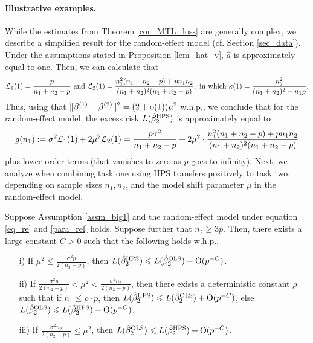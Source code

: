 \paragraph{Illustrative examples.}
While the estimates from Theorem \ref{cor_MTL_loss} are generally complex, we describe a simplified result for the random-effect model (cf. Section \ref{sec_data}).
Under the assumptions stated in Proposition \ref{lem_hat_v}, $\hat{a}$ is approximately equal to one.
Then, we can calculate that
\[ \mathcal{L}_1(1) = \frac{p}{n_1 + n_2 - p} \text{ and } \mathcal{L}_2(1) = \frac{n_1^2(n_1 + n_2 - p) + p n_1 n_2}{(n_1 + n_2)^2 (n_1 + n_2 - p)}, \text{ in which } \kappa(1) = \frac{n_2^2}{(n_1 + n_2)^2 - n_1 p}. \]
Thus, using that $\|\beta^{(1)}-\beta^{(2)}\|^2 = (2+\operatorname{o}(1))\mu^2$ w.h.p., we conclude that for the random-effect model, the excess risk $L(\hat{\beta}_2^{\textup{HPS}})$ is approximately equal to
$$ g(n_1) := \sigma^2 \mathcal L_1(1) +   2\mu^2 \mathcal L_2(1)= \frac{p\sigma^2}{n_1+n_2-p} +  2\mu^2 \cdot \frac{n_1^2 (n_1+n_2-p)+p n_1n_2}{(n_1+n_2)^2(n_1+n_2-p)}$$
plus lower order terms (that vanishes to zero as $p$ goes to infinity).
Next, we analyze when combining task one using HPS transfers positively to task two, depending on sample sizes $n_1, n_2$, and the model shift parameter $\mu$ in the random-effect model.

\begin{proposition}\label{claim_model_shift}
    Suppose Assumption \ref{assm_big1} and the random-effect model under equation \eqref{eq_re} and \eqref{para_rel} holds.
    Suppose further that $n_2 \ge 3p$.
    Then, there exists a large constant $C > 0$ such that the following holds w.h.p.,
    \begin{enumerate}
        \item[i)] If $\mu^2 \le \frac{\sigma^2 p}{2(n_2 - p)}$, then $L(\hat{\beta}_2^{\textup{HPS}}) \leqslant L(\hat{\beta}_2^{\textup{OLS}}) + \operatorname{O}(p^{-C})$.
        \item[ii)] If $\frac{\sigma^2 p}{2(n_2 - p)} < \mu^2 < \frac{\sigma^2 n_2}{2(n_2 - p)}$, then there exists a deterministic constant $\rho$ such that if $n_1 \le \rho\cdot p$, then $L(\hat{\beta}_2^{\textup{HPS}}) \leqslant L(\hat{\beta}_2^{\textup{OLS}}) + \operatorname{O}(p^{-C})$, else $L(\hat{\beta}_2^{\textup{OLS}}) \leqslant L(\hat{\beta}_2^{\textup{HPS}}) + \operatorname{O}(p^{-C})$.
        \item[iii)] If $\frac{\sigma^2 n_2} {2(n_2 - p)} \le \mu^2$, then $L(\hat{\beta}_2^{\textup{OLS}}) \leqslant L(\hat{\beta}_2^{\textup{HPS}}) + \operatorname{O}(p^{-C})$.
    \end{enumerate}
\end{proposition}

